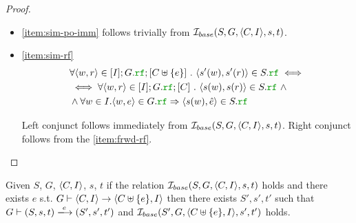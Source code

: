 \documentclass[12pt]{article}
\begin{document}
\begin{proof}
\begin{itemize}
  \item \ref{item:sim-po-imm} follows trivially from $\mathcal{I}_{base}(S, G, \langle C, I \rangle, s, t)$.
    
  \item \ref{item:sim-rf} \\
    
    \begin{equation*}
      \begin{split}
        & \forall{\tup{w, r} \in [I];G.\lRF;[C \uplus \{e\}]} ~.~
          \tup{s'(w), s'(r)} \in S.\lRF \iff \\
        & \iff \forall{\tup{w, r} \in [I];G.\lRF;[C]} ~.~ \tup{s(w), s(r)} \in S.\lRF ~ \wedge \\
        & \wedge \forall{w \in I}. \tup{w, e} \in G.\lRF \Rightarrow \tup{s(w), \hat{e}} \in S.\lRF
      \end{split}
    \end{equation*}

    Left conjunct follows immediately from $\mathcal{I}_{base}(S, G, \langle C, I \rangle, s, t)$.
    Right conjunct follows from the \ref{item:frwd-rf}.
    
  \end{itemize}
  
\end{proof}

\begin{lemma}
  Given $S$, $G$, $\langle C, I \rangle$, $s$, $t$
  if the relation $\mathcal{I}_{base}(S, G, \langle C, I \rangle, s, t)$ holds and
  there exists $e$ s.t. $G \vdash \langle C, I \rangle \rightarrow \langle C \uplus \{e\}, I \rangle$ then
  there exists $S', s', t'$ such that
  $G \vdash (S, s, t) \ESstep{e} (S', s', t')$
  and $\mathcal{I}_{base}(S', G, \langle C \uplus \{e\}, I \rangle, s', t')$ holds.
\end{lemma}
\end{document}
